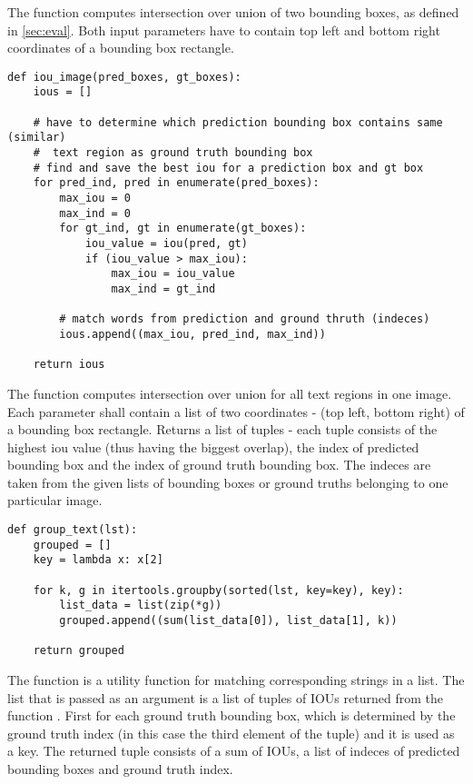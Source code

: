 The function  computes intersection over union of two bounding boxes, as defined in \ref*{sec:eval}. Both input parameters have to contain top left and bottom right coordinates of a bounding box rectangle.

\begin{lstlisting}[caption=iou\_image]
def iou_image(pred_boxes, gt_boxes):
    ious = []

    # have to determine which prediction bounding box contains same (similar) 
    #  text region as ground truth bounding box
    # find and save the best iou for a prediction box and gt box
    for pred_ind, pred in enumerate(pred_boxes):
        max_iou = 0
        max_ind = 0
        for gt_ind, gt in enumerate(gt_boxes):
            iou_value = iou(pred, gt)
            if (iou_value > max_iou):
                max_iou = iou_value
                max_ind = gt_ind

        # match words from prediction and ground thruth (indeces)     
        ious.append((max_iou, pred_ind, max_ind))

    return ious

\end{lstlisting}

The function  computes intersection over union for all text regions in one image.
Each parameter shall contain a list of two coordinates - (top left, bottom right) of a bounding box rectangle.
Returns a list of tuples - each tuple consists of the highest iou value (thus having the biggest overlap), the index of predicted bounding box and  the index of ground truth bounding box. The indeces are taken from the given lists of bounding boxes or ground truths belonging to one particular image.

\begin{lstlisting}[caption=group\_text]
def group_text(lst):
    grouped = []
    key = lambda x: x[2]

    for k, g in itertools.groupby(sorted(lst, key=key), key):
        list_data = list(zip(*g))
        grouped.append((sum(list_data[0]), list_data[1], k))

    return grouped
\end{lstlisting}

The function  is a utility function for matching corresponding strings in a list. The list that is passed as an argument is a list of tuples of IOUs returned from the function . First for each ground truth bounding box, which is determined by the ground truth index (in this case the third element of the tuple) and it is used as a key. The returned tuple consists of a sum of IOUs, a list of indeces of predicted bounding boxes and ground truth index.

